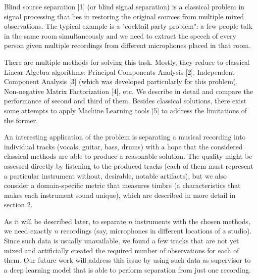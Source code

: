 \documentclass[../main.tex]{subfiles} %
\begin{document}

Blind source separation [1] (or blind signal separation) is a classical problem in signal processing that lies in restoring the original sources from multiple mixed observations. The typical example is a "cocktail party problem": a few people talk in the same room simultaneously and we need to extract the speech of every person given multiple recordings from different microphones placed in that room.

There are multiple methods for solving this task. Mostly, they reduce to classical Linear Algebra algorithms: Principal Components Analysis [2], Independent Component Analysis [3] (which was developed particularly for this problem), Non-negative Matrix Factorization [4], etc. We describe in detail and compare the performance of second and third of them. Besides classical solutions, there exist some attempts to apply Machine Learning tools [5] to address the limitations of the former.


An interesting application of the problem is separating a musical recording into individual tracks (vocals, guitar, bass, drums) with a hope that the considered classical methods are able to produce a reasonable solution. The quality might be assessed directly by listening to the produced tracks (each of them must represent a particular instrument without, desirable, notable artifacts), but we also consider a domain-specific metric that measures timbre (a characteristics that makes each instrument sound unique), which are described in more detail in section 2. 


As it will be described later, to separate $n$ instruments with the chosen methods, we need exactly $n$ recordings (say, microphones in different locations of a studio). Since such data is usually unavailable, we found a few tracks that are not yet mixed and artificially created the required number of observations for each of them. Our future work will address this issue by using such data as supervisor to a deep learning model that is able to perform separation from just one recording.
 
\end{document}
